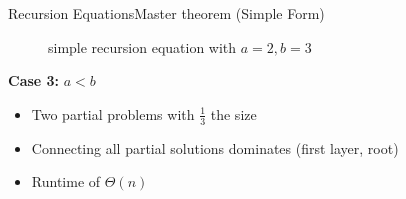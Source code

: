 
%      


\begin{frame}{Recursion Equations}{Master theorem (Simple Form)}
  \begin{figure}[!h]
    \begin{adjustbox}{width=\linewidth}
      \def\AlgoREDivide{2}%
      \def\AlgoRESize{0.33}%
      \def\AlgoREScale{15}%
      
    \end{adjustbox}
    \caption{simple recursion equation with {\color{MainA}$a = 2, b = 3$}}
    \label{fig:recursion_equations:master_theorem_tree_2_3}
  \end{figure}
  \textbf{Case 3:} {\color{MainA}$a < b$}
  \begin{itemize}
    \item<3->
      Two partial problems with $\frac{1}{3}$ the size
    \item<4->
      Connecting all partial solutions dominates (first layer, root)
    \item<5->
      Runtime of {\color{MainA}$\Theta(n)$}
  \end{itemize}
\end{frame}

